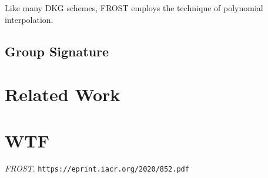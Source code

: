 \documentclass{article}
\begin{document}
Like many DKG schemes, FROST employs the technique of polynomial interpolation.


\subsection{
  Group Signature
}


\newpage
\onecolumn
\section{
  Related Work
}


\newpage
\onecolumn
\section{
  WTF
}


\newpage
\onecolumn
\begin{thebibliography}{1}

  \emph{FROST}.
  \texttt{https://eprint.iacr.org/2020/852.pdf}

\end{thebibliography}
\end{document}
